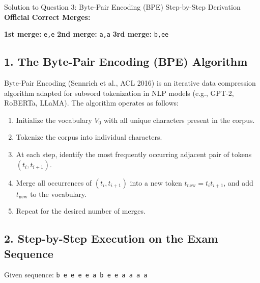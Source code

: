 \documentclass[11pt,a4paper]{article}
\begin{document}
\vspace{0.4cm}

\begin{solutionbox}{Solution to Question 3: Byte-Pair Encoding (BPE) Step-by-Step Derivation}
\textbf{Official Correct Merges:}
\begin{center}
    \textbf{1st merge:} \texttt{e,e} \qquad\qquad
    \textbf{2nd merge:} \texttt{a,a} \qquad\qquad
    \textbf{3rd merge:} \texttt{b,ee}
\end{center}

\medskip
\subsection*{1. The Byte-Pair Encoding (BPE) Algorithm}
Byte-Pair Encoding (Sennrich et al., ACL 2016) is an iterative data compression algorithm adapted for subword tokenization in NLP models (e.g., GPT-2, RoBERTa, LLaMA). The algorithm operates as follows:
\begin{enumerate}[label=\arabic*.,leftmargin=1.5em,itemsep=1pt]
    \item Initialize the vocabulary $V_0$ with all unique characters present in the corpus.
    \item Tokenize the corpus into individual characters.
    \item At each step, identify the most frequently occurring adjacent pair of tokens $(t_i, t_{i+1})$.
    \item Merge all occurrences of $(t_i, t_{i+1})$ into a new token $t_{\text{new}} = t_i t_{i+1}$, and add $t_{\text{new}}$ to the vocabulary.
    \item Repeat for the desired number of merges.
\end{enumerate}

\subsection*{2. Step-by-Step Execution on the Exam Sequence}
Given sequence: \texttt{b e e e e a b e e a a a a}


\end{solutionbox}
\end{document}

